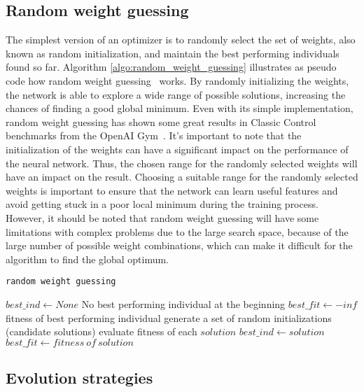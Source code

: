 \subsection{Random weight guessing}
The simplest version of an optimizer is to randomly select the set of weights, also known as random initialization, and maintain the best performing individuals found so far. Algorithm \ref{algo:random_weight_guessing} illustrates as pseudo code  how random weight guessing~\cite{schmidhuber_evaluating_2001} works. By randomly initializing the weights, the network is able to explore a wide range of possible solutions, increasing the chances of finding a good global minimum. Even with its simple implementation, random weight guessing has shown some great results in Classic Control benchmarks from the OpenAI Gym~\cite{oller_analyzing_2020}. It's important to note that the initialization of the weights can have a significant impact on the performance of the neural network. Thus, the chosen range for the randomly selected weights will have an impact on the result. Choosing a suitable range for the randomly selected weights is important to ensure that the network can learn useful features and avoid getting stuck in a poor local minimum during the training process. However, it should be noted that random weight guessing will have some limitations with complex problems due to the large search space, because of the large number of possible weight combinations, which can make it difficult for the algorithm to find the global optimum.

\begin{algorithm}
\caption{\texttt{random weight guessing}}
\label{algo:random_weight_guessing}
\begin{algorithmic}[1]
\State $best\_ind \gets None$ \Comment No best performing individual at the beginning
\State $best\_fit \gets -inf$ \Comment fitness of best performing individual
  \State generate a set of random initializations (candidate solutions)
  \State evaluate fitness of each $solution$ 
    \State $best\_ind \gets solution$
    \State $best\_fit \gets fitness\ of\ solution$
  \EndIf
\EndWhile
\end{algorithmic}
\end{algorithm}


\subsection{Evolution strategies}

